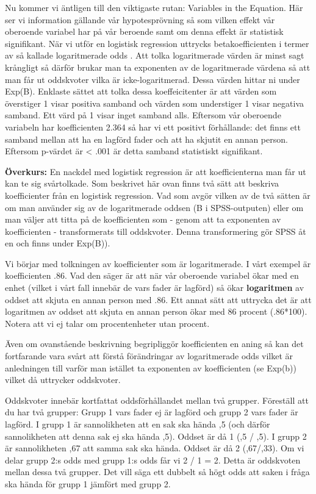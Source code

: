 \documentclass[
]{book}
\begin{document}
Nu kommer vi äntligen till den viktigaste rutan: Variables in the Equation. Här ser vi information gällande vår hypotesprövning så som vilken effekt vår oberoende variabel har på vår beroende samt om denna effekt är statistisk signifikant. När vi utför en logistisk regression uttrycks betakoefficienten i termer av så kallade logaritmerade odds . Att tolka logaritmerade värden är minst sagt krångligt så därför brukar man ta exponenten av de logaritmerade värdena så att man får ut oddskvoter vilka är icke-logaritmerad. Dessa värden hittar ni under Exp(B). Enklaste sättet att tolka dessa koeffeicitenter är att värden som överstiger 1 visar positiva samband och värden som understiger 1 visar negativa samband. Ett värd på 1 visar inget samband alls. Eftersom vår oberoende variabeln har koefficienten 2.364 så har vi ett positivt förhållande: det finns ett samband mellan att ha en lagförd fader och att ha skjutit en annan person. Eftersom p-värdet är \textless{} .001 är detta samband statistiskt signifikant.

\textbf{Överkurs:} En nackdel med logistisk regression är att koefficienterna man får ut kan te sig svårtolkade. Som beskrivet här ovan finns två sätt att beskriva koefficienter från en logistisk regression. Vad som avgör vilken av de två sätten är om man använder sig av de logaritmerade oddsen (B i SPSS-outputen) eller om man väljer att titta på de koefficienten som - genom att ta exponenten av koefficienten - transformerats till oddskvoter. Denna transformering gör SPSS åt en och finns under Exp(B)).

Vi börjar med tolkningen av koefficienter som är logaritmerade. I vårt exempel är koefficienten .86. Vad den säger är att när vår oberoende variabel ökar med en enhet (vilket i vårt fall innebär de vars fader är lagförd) så ökar \textbf{logaritmen} av oddset att skjuta en annan person med .86. Ett annat sätt att uttrycka det är att logaritmen av oddset att skjuta en annan person ökar med 86 procent (.86*100). Notera att vi ej talar om procentenheter utan procent.

Även om ovanstående beskrivning begripliggör koefficienten en aning så kan det fortfarande vara svårt att förstå förändringar av logaritmerade odds vilket är anledningen till varför man istället ta exponenten av koefficienten (se Exp(b)) vilket då uttrycker oddskvoter.

Oddskvoter innebär kortfattat oddsförhållandet mellan två grupper. Föreställ att du har två grupper: Grupp 1 vars fader ej är lagförd och grupp 2 vars fader är lagförd. I grupp 1 är sannolikheten att en sak ska hända ,5 (och därför sannolikheten att denna sak ej ska hända ,5). Oddset är då 1 (,5 / ,5). I grupp 2 är sannolikheten ,67 att samma sak ska hända. Oddset är då 2 (,67/,33). Om vi delar grupp 2:s odds med grupp 1:s odds får vi 2 / 1 = 2. Detta är oddskvoten mellan dessa två grupper. Det vill säga ett dubbelt så högt odds att saken i fråga ska hända för grupp 1 jämfört med grupp 2.
\end{document}
